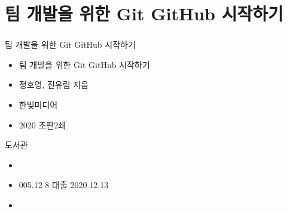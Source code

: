\documentclass[aspectratio=1610,17pt,xcolor=pdftex,dvipsnames,table,handout]{beamer}
\begin{document}
		\section{팀 개발을 위한 Git GitHub 시작하기}
		\begin{frame} [t,plain]
		\frametitle{}
			\begin{block}  {팀 개발을 위한 Git GitHub 시작하기}
			\setlength{\leftmargini}{4em}			
			\begin{itemize}
				\item [제목]  	팀 개발을 위한 Git GitHub 시작하기
				\item [지은이]	정호영, 진유림 지음
				\item [출판사]	한빛미디어
				\item [출판일]	2020 초판2쇄
			\end{itemize}
			\end{block}						
								
			\begin{block}  {도서관}
			\setlength{\leftmargini}{4em}			
			\begin{itemize}
				\item [중앙]
				\item [수정]		005.12 8   대출 2020.12.13 
				\item [도서관]
			\end{itemize}
			\end{block}						

		\end{frame}						

\end{document}
